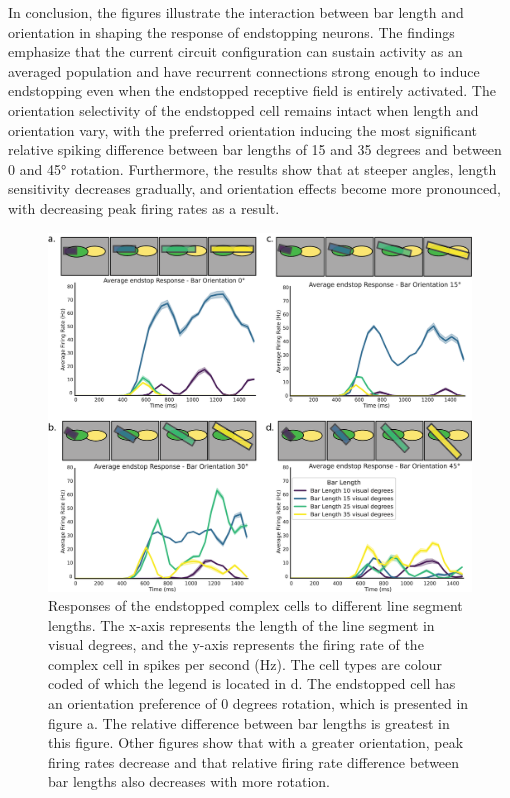 \documentclass[12pt]{article}
\begin{document}
In conclusion, the figures illustrate the interaction between bar length and orientation in shaping the response of endstopping neurons. The findings emphasize that the current circuit configuration can sustain activity as an averaged population and have recurrent connections strong enough to induce endstopping even when the endstopped receptive field is entirely activated. The orientation selectivity of the endstopped cell remains intact when length and orientation vary, with the preferred orientation inducing the most significant relative spiking difference between bar lengths of 15 and 35 degrees and between 0 and 45° rotation. Furthermore, the results show that at steeper angles, length sensitivity decreases gradually, and orientation effects become more pronounced, with decreasing peak firing rates as a result.


\begin{figure}[H]
    \centering
    \includegraphics[width=1 \textwidth]{./figures/LIF_endstopping_length_orientation.png}
    \caption{Responses of the endstopped complex cells to different line segment lengths. The x-axis represents the length of the line segment in visual degrees, and the y-axis represents the firing rate of the complex cell in spikes per second (Hz). The cell types are colour coded of which the legend is located in d. The endstopped cell has an orientation preference of 0 degrees rotation, which is presented in figure a. The relative difference between bar lengths is greatest in this figure. Other figures show that with a greater orientation, peak firing rates decrease and that relative firing rate difference between bar lengths also decreases with more rotation.}
    \label{fig:endstopping}
\end{figure}
\end{document}
